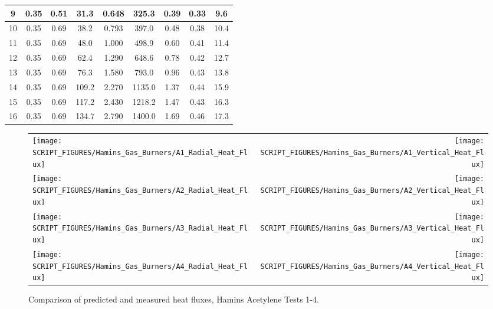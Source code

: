 \begin{table}[ht]
\begin{center}
\begin{tabular}{|c|c|c|c|c|c|c||c|c|}
9        & 0.35     & 0.51       & 31.3        &  0.648                &  325.3         & 0.39         & 0.33     & 9.6             \\ \hline
10       & 0.35     & 0.69       & 38.2        &  0.793                &  397.0         & 0.48         & 0.38     & 10.4             \\ \hline
11       & 0.35     & 0.69       & 48.0        &  1.000                &  498.9         & 0.60         & 0.41     & 11.4             \\ \hline
12       & 0.35     & 0.69       & 62.4        &  1.290                &  648.6         & 0.78         & 0.42     & 12.7             \\ \hline
13       & 0.35     & 0.69       & 76.3        &  1.580                &  793.0         & 0.96         & 0.43     & 13.8             \\ \hline
14       & 0.35     & 0.69       & 109.2       &  2.270                &  1135.0        & 1.37         & 0.44     & 15.9             \\ \hline
15       & 0.35     & 0.69       & 117.2       &  2.430                &  1218.2        & 1.47         & 0.43     & 16.3             \\ \hline
16       & 0.35     & 0.69       & 134.7       &  2.790                &  1400.0        & 1.69         & 0.46     & 17.3             \\ \hline
\end{tabular}
\end{center}
\label{Hamins_Acetylene_Table}
\end{table}

\newpage


\begin{figure}[p]
\begin{tabular*}{\textwidth}{l@{\extracolsep{\fill}}r}
\texttt{[image: SCRIPT\_FIGURES/Hamins\_Gas\_Burners/A1\_Radial\_Heat\_Flux]} &
\texttt{[image: SCRIPT\_FIGURES/Hamins\_Gas\_Burners/A1\_Vertical\_Heat\_Flux]} \\
\texttt{[image: SCRIPT\_FIGURES/Hamins\_Gas\_Burners/A2\_Radial\_Heat\_Flux]} &
\texttt{[image: SCRIPT\_FIGURES/Hamins\_Gas\_Burners/A2\_Vertical\_Heat\_Flux]} \\
\texttt{[image: SCRIPT\_FIGURES/Hamins\_Gas\_Burners/A3\_Radial\_Heat\_Flux]} &
\texttt{[image: SCRIPT\_FIGURES/Hamins\_Gas\_Burners/A3\_Vertical\_Heat\_Flux]} \\
\texttt{[image: SCRIPT\_FIGURES/Hamins\_Gas\_Burners/A4\_Radial\_Heat\_Flux]} &
\texttt{[image: SCRIPT\_FIGURES/Hamins\_Gas\_Burners/A4\_Vertical\_Heat\_Flux]}
\end{tabular*}
\label{Hamins_Acetylene_1-4}
\caption[Heat flux predictions, Hamins acetylene burner Tests 1-4]
{Comparison of predicted and measured heat fluxes, Hamins Acetylene Tests 1-4.}
\end{figure}

